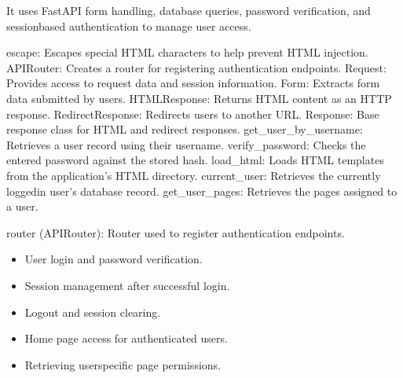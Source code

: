 \documentclass[letterpaper,10pt,english]{sphinxmanual}
\begin{document}
\sphinxAtStartPar
It uses FastAPI form handling, database queries, password verification,
and session\sphinxhyphen{}based authentication to manage user access.
\begin{description}
\sphinxAtStartPar
escape: Escapes special HTML characters to help prevent HTML injection.
APIRouter: Creates a router for registering authentication endpoints.
Request: Provides access to request data and session information.
Form: Extracts form data submitted by users.
HTMLResponse: Returns HTML content as an HTTP response.
RedirectResponse: Redirects users to another URL.
Response: Base response class for HTML and redirect responses.
get\_user\_by\_username: Retrieves a user record using their username.
verify\_password: Checks the entered password against the stored hash.
load\_html: Loads HTML templates from the application’s HTML directory.
current\_user: Retrieves the currently logged\sphinxhyphen{}in user’s database record.
get\_user\_pages: Retrieves the pages assigned to a user.

\sphinxAtStartPar
router (APIRouter): Router used to register authentication endpoints.

\begin{itemize}
\item {} 
\sphinxAtStartPar
User login and password verification.

\item {} 
\sphinxAtStartPar
Session management after successful login.

\item {} 
\sphinxAtStartPar
Logout and session clearing.

\item {} 
\sphinxAtStartPar
Home page access for authenticated users.

\item {} 
\sphinxAtStartPar
Retrieving user\sphinxhyphen{}specific page permissions.

\end{itemize}

\end{description}
\end{document}

